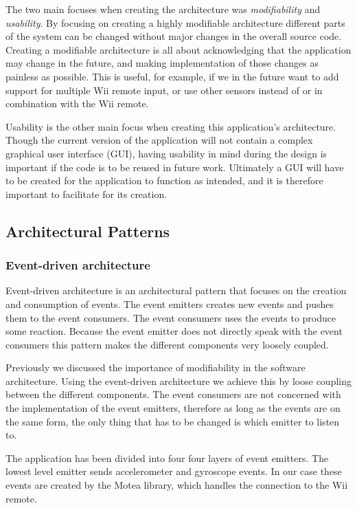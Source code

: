 The two main focuses when creating the architecture was \emph{modifiability} and \emph{usability}. By focusing on creating a highly modifiable architecture different parts of the system can be changed without major changes in the overall source code. Creating a modifiable architecture is all about acknowledging that the application may change in the future, and  making implementation of those changes as painless as possible. This is useful, for example, if we in the future want to add support for multiple Wii remote input, or use other sensors instead of or in combination with the Wii remote.

Usability is the other main focus when creating this application’s architecture. Though the current version of the application will not contain a complex graphical user interface (GUI), having usability in mind during the design is important if the code is to be reused in future work. Ultimately a GUI will have to be created for the application to function as intended, and it is therefore important to facilitate for its creation.

\subsection{Architectural Patterns}
\subsubsection{Event-driven architecture}
Event-driven architecture is an architectural pattern that focuses on the creation and consumption of events. The event emitters creates new events and pushes them to the event consumers. The event consumers uses the events to produce some reaction. Because the event emitter does not directly speak with the event consumers this pattern makes the different components very loosely coupled.

Previously we discussed the importance of modifiability in the software architecture. Using the event-driven architecture we achieve this by loose coupling between the different components. The event consumers are not concerned with the implementation of the event emitters, therefore as long as the events are on the same form, the only thing that has to be changed is which emitter to listen to. 

The application has been divided into four four layers of event emitters. The lowest level emitter sends accelerometer and gyroscope events. In our case these events are created by the Motea library, which handles the connection to the Wii remote. 

